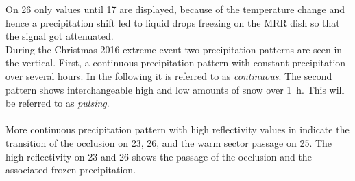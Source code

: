 On \SI{26}{\dec} only values until \SI{17}{\UTC} are displayed, because of the temperature change and hence a precipitation shift led to liquid drops freezing on the MRR dish so that the signal got attenuated.
\\
During the Christmas 2016 extreme event two precipitation patterns are seen in the vertical. First, a continuous precipitation pattern with constant precipitation over several hours. In the following it is referred to as \textit{continuous}.
The second pattern shows interchangeable high and low amounts of snow over \SI{1}{\hour}. This will be referred to as \textit{pulsing}.
\\
\\
More continuous precipitation pattern with high reflectivity values in  indicate the transition of the occlusion on \num{23}, \num{26}, and the warm sector passage on \SI{25}{\dec}.
The high reflectivity on \num{23} and \SI{26}{\dec} shows the passage of the occlusion and the associated frozen precipitation.
